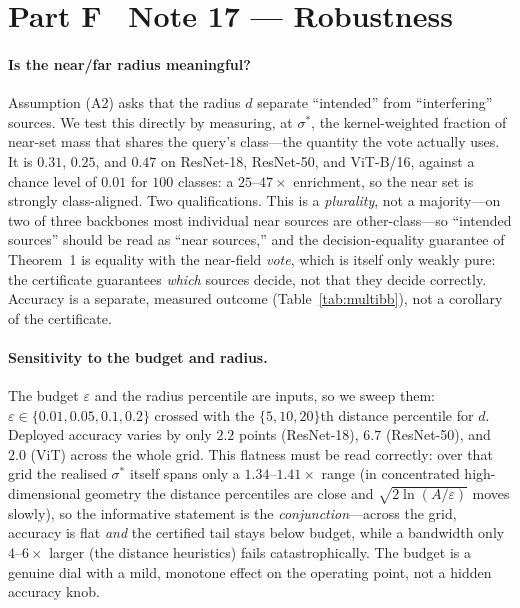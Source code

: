 \documentclass[10pt,twocolumn]{article}
\newcommand{\sstar}{\sigma^{*}}
\begin{document}
\section*{Part F \textperiodcentered\ Note 17 --- Robustness}
\paragraph{Is the near/far radius meaningful?} Assumption (A2) asks that the radius $d$ separate ``intended'' from ``interfering'' sources. We test this directly by measuring, at $\sstar$, the kernel-weighted fraction of near-set mass that shares the query's class---the quantity the vote actually uses. It is $0.31$, $0.25$, and $0.47$ on ResNet-18, ResNet-50, and ViT-B/16, against a chance level of $0.01$ for $100$ classes: a $25$--$47\times$ enrichment, so the near set is strongly class-aligned. Two qualifications. This is a \emph{plurality}, not a majority---on two of three backbones most individual near sources are other-class---so ``intended sources'' should be read as ``near sources,'' and the decision-equality guarantee of Theorem~1 is equality with the near-field \emph{vote}, which is itself only weakly pure: the certificate guarantees \emph{which} sources decide, not that they decide correctly. Accuracy is a separate, measured outcome (Table~\ref{tab:multibb}), not a corollary of the certificate.

\paragraph{Sensitivity to the budget and radius.} The budget $\varepsilon$ and the radius percentile are inputs, so we sweep them: $\varepsilon\in\{0.01,0.05,0.1,0.2\}$ crossed with the $\{5,10,20\}$th distance percentile for $d$. Deployed accuracy varies by only $2.2$ points (ResNet-18), $6.7$ (ResNet-50), and $2.0$ (ViT) across the whole grid. This flatness must be read correctly: over that grid the realised $\sstar$ itself spans only a $1.34$--$1.41\times$ range (in concentrated high-dimensional geometry the distance percentiles are close and $\sqrt{2\ln(A/\varepsilon)}$ moves slowly), so the informative statement is the \emph{conjunction}---across the grid, accuracy is flat \emph{and} the certified tail stays below budget, while a bandwidth only $4$--$6\times$ larger (the distance heuristics) fails catastrophically. The budget is a genuine dial with a mild, monotone effect on the operating point, not a hidden accuracy knob.
\end{document}

